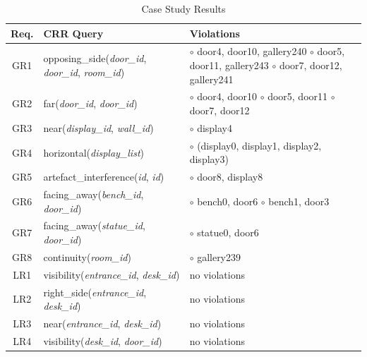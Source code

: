 \documentclass[12pt]{ucthesis}
\begin{document}
\begin{table}[t]
  \begin{center}
  \begin{tabular}{ | c | p{7.2cm} | p{7.3cm} |}
    \hline
    Req. & CRR Query & Violations\\ \hline
    GR1 & opposing\_side(\emph{door\_id}, \emph{door\_id}, \emph{room\_id}) & $\circ$ door4, door10, gallery240 
    													\newline $\circ$ door5, door11, gallery243 
    													\newline $\circ$ door7, door12, gallery241 \\ \hline
    GR2 & far(\emph{door\_id}, \emph{door\_id})  &  $\circ$ door4, door10 
                                          \newline  $\circ$ door5, door11
                                          \newline  $\circ$ door7, door12 \\ \hline
    GR3 & near(\emph{display\_id}, \emph{wall\_id}) & $\circ$ display4 \\ \hline
    GR4 & horizontal(\emph{display\_list}) & $\circ$ (display0, display1, display2, display3) \\ \hline
    GR5 & artefact\_interference(\emph{id}, \emph{id}) & $\circ$ door8, display8 \\ \hline
    GR6 & facing\_away(\emph{bench\_id}, \emph{door\_id}) & $\circ$ bench0, door6
                                                   \newline $\circ$ bench1, door3 \\ \hline
    GR7 & facing\_away(\emph{statue\_id}, \emph{door\_id}) & $\circ$ statue0, door6 \\ \hline
    GR8 & continuity(\emph{room\_id}) &  $\circ$ gallery239 \\ \hline
    LR1 & visibility(\emph{entrance\_id}, \emph{desk\_id})& no violations\\ \hline
    LR2 & right\_side(\emph{entrance\_id}, \emph{desk\_id})& no violations \\ \hline
    LR3 & near(\emph{entrance\_id}, \emph{desk\_id})& no violations\\ \hline
    LR4 & visibility(\emph{desk\_id}, \emph{door\_id})& no violations\\
    \hline
  \end{tabular}
  \end{center}
\caption{Case Study Results}
\label{results}
\end{table} 
\end{document}
